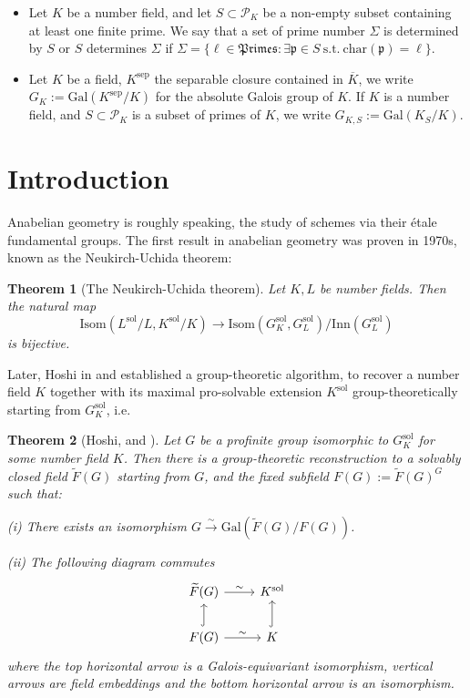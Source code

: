 \documentclass{article}
\newtheorem{thm}{Theorem}[section]
\theoremstyle{plain}
\theoremstyle{definition}
\theoremstyle{remark}
\begin{document}
\begin{itemize}
    \item Let $K$ be a number field, and let $S \subset \mathscr{P}_K$ be a non-empty subset containing at least one finite prime. We say that a set of prime number $\Sigma$ is determined by $S$ or $S$ determines $\Sigma$ if $\Sigma = \{\ell \in \mathfrak{Primes}: \exists\mathfrak{p} \in S~\text{s.t.}~\text{char}(\mathfrak{p}) = \ell\}$.
    \item Let $K$ be a field, $K^{\text{sep}}$ the separable closure contained in $\overline{K}$, we write $G_K:=\text{Gal}(K^{\text{sep}}/K)$ for the absolute Galois group of $K$. If $K$ is a number field, and $S \subset \mathscr{P}_K$ is a subset of primes of $K$, we write $G_{K,S} := \text{Gal}(K_S/K)$.
\end{itemize}
\section{Introduction}
Anabelian geometry is roughly speaking, the study of schemes via their \'etale fundamental groups. The first result in anabelian geometry was proven in 1970s, known as the Neukirch-Uchida theorem:
\begin{thm}[The Neukirch-Uchida theorem]
Let $K,L$ be number fields. Then the natural map
$$
\text{Isom}(L^{\text{sol}}/L,K^{\text{sol}}/K) \to \text{Isom}(G_K^{\text{sol}},G_L^{\text{sol}})/\text{Inn}(G_L^{\text{sol}})
$$
is bijective.
\end{thm}
Later, Hoshi in \cite{Ho1} and \cite{Ho2} established a group-theoretic algorithm, to recover a number field $K$ together with its maximal pro-solvable extension $K^{\text{sol}}$ group-theoretically starting from $G_K^{\text{sol}}$, i.e.
\begin{thm}[Hoshi, \cite{Ho1} and \cite{Ho2}]
Let $G$ be a profinite group isomorphic to $G_{K}^{\text{sol}}$ for some number field $K$. Then there is a group-theoretic reconstruction to a solvably closed field $\widetilde{F}(G)$ starting from $G$, and the fixed subfield $F(G) := \widetilde{F}(G)^G$ such that: \par 
(i) There exists an isomorphism $G \xrightarrow{\sim} \text{Gal}(\widetilde{F}(G)/F(G))$.\par 
(ii) The following diagram commutes
$$
\begin{tikzcd}
\widetilde{F}(G) \arrow[r,"\sim"] & K^{\text{sol}} \\
F(G) \arrow[u,hookrightarrow] \arrow[r,"\sim"] & K \arrow[u,hookrightarrow]
\end{tikzcd}
$$
where the top horizontal arrow is a Galois-equivariant isomorphism, vertical arrows are field embeddings and the bottom horizontal arrow is an isomorphism.
\end{thm}
\end{document}
